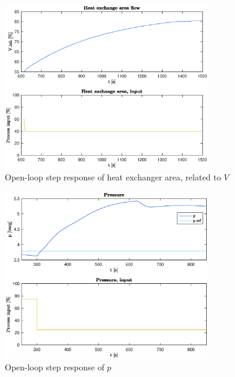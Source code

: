 \documentclass[12pt]{article}
\begin{document}
\begin{figure}
\centering
\includegraphics[width=0.8\textwidth]{../Systemanalyse/Log_Data_to_Matlab/Figurer/Stegeksperimenter/LC1028.eps}
\caption{Open-loop step response of heat exchanger area, related to $V$}
\label{fig:ol_step_LC1028}
\end{figure}

\begin{figure}
\centering
\includegraphics[width=0.8\textwidth]{../Systemanalyse/Log_Data_to_Matlab/Figurer/Stegeksperimenter/PC1024.eps}
\caption{Open-loop step response of $p$}
\label{fig:ol_step_PC1024}
\end{figure}
\end{document}
